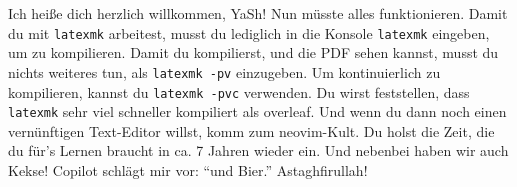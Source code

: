 

\frontmatter

\maketitle

\makecorrectorpage

\tableofcontents
 


\mainmatter

Ich heiße dich herzlich willkommen, YaSh!
Nun müsste alles funktionieren.
Damit du mit \texttt{latexmk} arbeitest, musst du lediglich in die Konsole \texttt{latexmk} eingeben, um zu kompilieren.
Damit du kompilierst, und die PDF sehen kannst, musst du nichts weiteres tun, als \texttt{latexmk -pv} einzugeben.
Um kontinuierlich zu kompilieren, kannst du \texttt{latexmk -pvc} verwenden.
Du wirst feststellen, dass \texttt{latexmk} sehr viel schneller kompiliert als overleaf. 
Und wenn du dann noch einen vernünftigen Text-Editor willst, komm zum neovim-Kult. Du holst die Zeit, die du für's Lernen braucht in
ca. 7 Jahren wieder ein. Und nebenbei haben wir auch Kekse! Copilot schlägt mir vor: \enquote{und Bier.} 
Astaghfirullah!










\appendix


\backmatter
\printbibliography

\cleardoublepage




